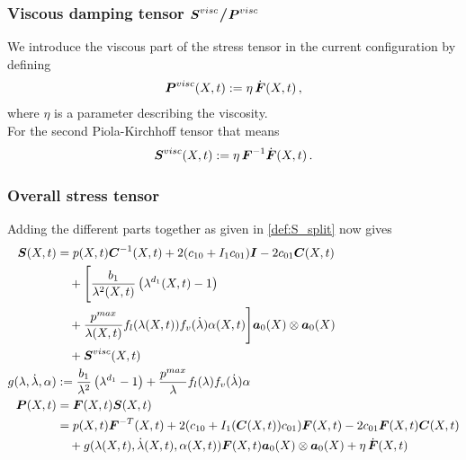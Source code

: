 \subsubsection{Viscous damping tensor $\boldsymbol{S}^{visc}$/$\boldsymbol{P}^{visc}$}
We introduce the viscous part of the stress tensor in the current configuration by defining
\begin{align}
\boldsymbol{P}^{visc}(X,t) := \eta\,\dot{\boldsymbol{F}}(X,t) \,,
\end{align}
where $\eta$ is a parameter describing the viscosity. 
\\
For the second Piola-Kirchhoff tensor that means
\begin{align}
\boldsymbol{S}^{visc}(X,t) := \eta\,\boldsymbol{F}^{-1}\dot{\boldsymbol{F}}(X,t) \,.
\end{align}

\subsubsection{Overall stress tensor}
Adding the different parts together as given in \eqref{def:S_split} now gives
\begin{align}
	\boldsymbol{S}(X,t) &= p(X,t)\boldsymbol{C}^{-1}(X,t) + 2(c_{10} + I_1c_{01})\boldsymbol{I} - 2c_{01}\boldsymbol{C}(X,t)\label{def:overallS}\\
			 &\quad+\Biggl[\frac{b_1}{\lambda^2(X,t)}\left(\lambda^{d_1}(X,t) - 1\right)\nonumber\\
			 &\quad+\frac{p^{max}}{\lambda(X,t)}f_l(\lambda(X,t))f_v(\dot{\lambda})\alpha(X,t)\Biggr]\boldsymbol{a}_0(X)\otimes\boldsymbol{a}_0(X)\\
			 &\quad+\boldsymbol{S}^{visc}(X,t)\nonumber\\
	g(\lambda,\dot{\lambda},\alpha)&:= \frac{b_1}{\lambda^2}\left(\lambda^{d_1} - 1\right)
		+\frac{p^{max}}{\lambda}f_l(\lambda)f_v(\dot{\lambda})\alpha\label{def:g}\\			 
	\boldsymbol{P}(X,t) &= \boldsymbol{F}(X,t)\boldsymbol{S}(X,t)\label{def:completeP}\\
			 &= p(X,t)\boldsymbol{F}^{-T}(X,t) + 2(c_{10} + I_1(\boldsymbol{C}(X,t))c_{01})\boldsymbol{F}(X,t) - 2c_{01}\boldsymbol{F}(X,t)\boldsymbol{C}(X,t)\nonumber\\
			 &\quad+g(\lambda(X,t),\dot{\lambda}(X,t),\alpha(X,t))\boldsymbol{F}(X,t)\boldsymbol{a}_0(X)\otimes\boldsymbol{a}_0(X)+\eta\,\dot{\boldsymbol{F}}(X,t)\nonumber
\end{align}

